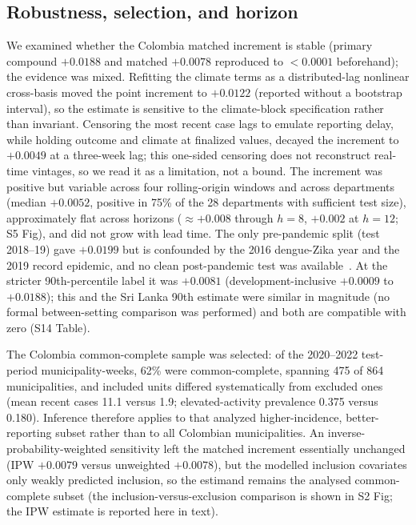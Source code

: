 \documentclass[11pt,a4paper]{article}
\begin{document}
\subsection{Robustness, selection, and horizon}\label{sec:robustness}
We examined whether the Colombia matched increment is stable (primary compound $+0.0188$ and matched $+0.0078$ reproduced to $<0.0001$ beforehand); the evidence was mixed. Refitting the climate terms as a distributed-lag nonlinear cross-basis moved the point increment to $+0.0122$ (reported without a bootstrap interval), so the estimate is sensitive to the climate-block specification rather than invariant. Censoring the most recent case lags to emulate reporting delay, while holding outcome and climate at finalized values, decayed the increment to $+0.0049$ at a three-week lag; this one-sided censoring does not reconstruct real-time vintages, so we read it as a limitation, not a bound. The increment was positive but variable across four rolling-origin windows and across departments (median $+0.0052$, positive in 75\% of the 28 departments with sufficient test size), approximately flat across horizons ($\approx+0.008$ through $h=8$, $+0.002$ at $h=12$; S5 Fig), and did not grow with lead time. The only pre-pandemic split (test 2018--19) gave $+0.0199$ but is confounded by the 2016 dengue-Zika year and the 2019 record epidemic, and no clean post-pandemic test was available~\cite{PAHO2023,ValleDelCauca2024}. At the stricter 90th-percentile label it was $+0.0081$ (development-inclusive $+0.0009$ to $+0.0188$); this and the Sri Lanka 90th estimate were similar in magnitude (no formal between-setting comparison was performed) and both are compatible with zero (S14 Table).

The Colombia common-complete sample was selected: of the 2020--2022 test-period municipality-weeks, 62\% were common-complete, spanning 475 of 864 municipalities, and included units differed systematically from excluded ones (mean recent cases 11.1 versus 1.9; elevated-activity prevalence 0.375 versus 0.180). Inference therefore applies to that analyzed higher-incidence, better-reporting subset rather than to all Colombian municipalities. An inverse-probability-weighted sensitivity left the matched increment essentially unchanged (IPW $+0.0079$ versus unweighted $+0.0078$), but the modelled inclusion covariates only weakly predicted inclusion, so the estimand remains the analysed common-complete subset (the inclusion-versus-exclusion comparison is shown in S2 Fig; the IPW estimate is reported here in text).
\end{document}
